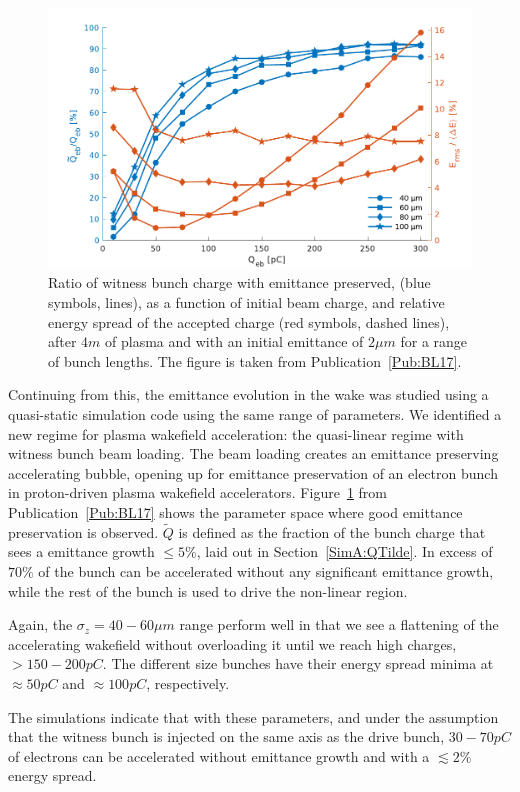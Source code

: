 \begin{figure}[hbt]
    \centering
    \includegraphics[width=0.8125\linewidth]{figures/BeamQuality}
    \caption{\label{Fig:Sum:BQ}
        Ratio of witness bunch charge with emittance preserved, (blue symbols, lines), as a function of initial beam charge, and relative energy spread of the accepted charge (red symbols, dashed lines), after $4\unit{m}$ of plasma and with an initial emittance of $2\unit{\mu m}$ for a range of bunch lengths.
        The figure is taken from Publication~\ref{Pub:BL17}.
    }
\end{figure}

Continuing from this, the emittance evolution in the wake was studied using a quasi-static simulation code using the same range of parameters.
We identified a new regime for plasma wakefield acceleration: the quasi-linear regime with witness bunch beam loading.
The beam loading creates an emittance preserving accelerating bubble, opening up for emittance preservation of an electron bunch in proton-driven plasma wakefield accelerators.
Figure~\ref{Fig:Sum:BQ} from Publication~\ref{Pub:BL17} shows the parameter space where good emittance preservation is observed.
$\tilde{Q}$ is defined as the fraction of the bunch charge that sees a emittance growth $\leq 5\%$, laid out in Section~\ref{SimA:QTilde}.
In excess of $70\%$ of the bunch can be accelerated without any significant emittance growth, while the rest of the bunch is used to drive the non-linear region.

Again, the $\sigma_z = 40-60\unit{\mu m}$ range perform well in that we see a flattening of the accelerating wakefield without overloading it until we reach high charges, $> 150-200\unit{pC}$.
The different size bunches have their energy spread minima at $\approx 50\unit{pC}$ and $\approx 100\unit{pC}$, respectively.

The simulations indicate that with these parameters, and under the assumption that the witness bunch is injected on the same axis as the drive bunch, $30-70\unit{pC}$ of electrons can be accelerated without emittance growth and with a $\lesssim 2\%$ energy spread.

